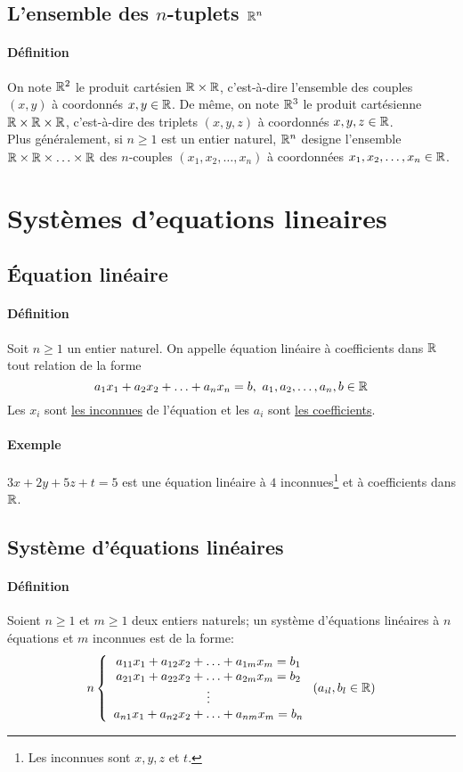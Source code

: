 %
\subsection{L'ensemble des $n$-tuplets $\mathbb{R}^n$}
%
\paragraph{Définition} On note $\mathbb{R}^2$ le produit cartésien $\mathbb{R} \times \mathbb{R}$, c'est-à-dire l'ensemble des couples $(x, y)$ à coordonnés $x, y \in \mathbb{R}$. De même, on note $\mathbb{R}^3$ le produit cartésienne $\mathbb{R} \times \mathbb{R} \times \mathbb{R}$, c'est-à-dire des triplets $(x, y, z)$ à coordonnés $x, y, z \in \mathbb{R}$. \\
Plus généralement, si $n \geq 1$ est un entier naturel, $\mathbb{R}^n$ designe l'ensemble $\mathbb{R} \times \mathbb{R} \times \ldots \times \mathbb{R}$ des $n$-couples $(x_1, x_2, \ldots, x_n)$ à coordonnées $x_1, x_2, \ldots, x_n \in \mathbb{R}$.
        
%
%
\section{Systèmes d'equations lineaires}
%
%

%
\subsection{Équation linéaire}
%
\paragraph{Définition} Soit $n \geq 1$ un entier naturel. On appelle équation linéaire à coefficients dans $\mathbb{R}$ tout relation de la forme 
$$a_1 x_1 + a_2 x_2 + \ldots + a_n x_n = b, ~ a_1, a_2, \ldots, a_n, b \in \mathbb{R}$$
Les $x_i$ sont \underline{les inconnues} de l'équation et les $a_i$ sont \underline{les coefficients}.

\paragraph{Exemple} $3 x + 2 y + 5 z + t = 5$ est une équation linéaire à $4$ inconnues\footnote{Les inconnues sont $x, y, z$ et $t$.} et à coefficients dans $\mathbb{R}$.

%
\subsection{Système d'équations linéaires}
%
\paragraph{Définition} Soient $n \geq 1$ et $m \geq 1$ deux entiers naturels; un système d'équations linéaires à $n$ équations et $m$ inconnues est de la forme:
$$n \left\{ \begin{array}{c}
  a_{11}x_{1} + a_{12}x_{2} + \ldots + a_{1m}x_{m} = b_{1} \\
  a_{21}x_{1} + a_{22}x_{2} + \ldots + a_{2m}x_{m} = b_{2} \\
  \vdots \\
  a_{n1}x_{1} + a_{n2}x_{2} + \ldots + a_{nm}x_{m} = b_{n}
\end{array} \right. (a_{il}, b_l \in \mathbb{R})$$

